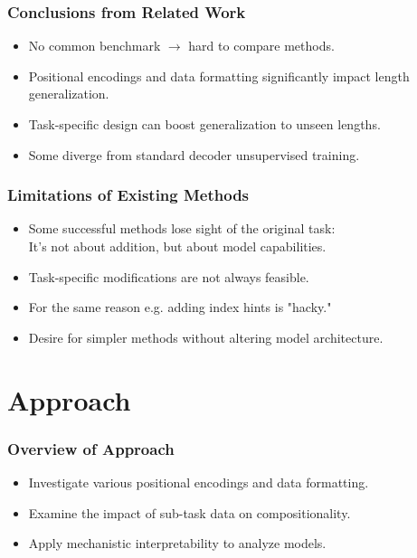 \documentclass[14pt,aspectratio=169]{beamer}
\theoremstyle{remark}
\begin{document}
\begin{frame}
    \frametitle{Conclusions from Related Work}
    \begin{itemize}
        \item No common benchmark $\rightarrow$ hard to compare methods.
        \item Positional encodings and data formatting significantly impact length generalization.
        \item Task-specific design can boost generalization to unseen lengths.
        \item Some diverge from standard decoder unsupervised training.
    \end{itemize}
\end{frame}

\begin{frame}
    \frametitle{Limitations of Existing Methods}
    \begin{itemize}
        \item Some successful methods lose sight of the original task:\\
              It's not about addition, but about model capabilities.
        \item Task-specific modifications are not always feasible.
        \item For the same reason e.g. adding index hints is "hacky."
        \item Desire for simpler methods without altering model architecture.
    \end{itemize}
\end{frame}

\section{Approach}

\begin{frame}
    \frametitle{Overview of Approach}
    \begin{itemize}
        \item Investigate various positional encodings and data formatting.
        \item Examine the impact of sub-task data on compositionality.
        \item Apply mechanistic interpretability to analyze models.
    \end{itemize}
\end{frame}
\end{document}

